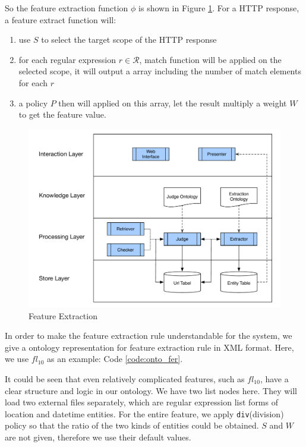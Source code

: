 So the feature extraction function $\phi$ is shown in Figure \ref{fig:feature_extraction}. For a HTTP response, a feature extract function will:
\begin{enumerate}
	\item use $S$ to select the target scope of the HTTP response
	\item for each regular expression $r \in \mathcal{R} $, match function will be applied on the selected scope, it will output a array including the number of match elements for each $r$
	\item a policy $P$ then will applied on this array, let the result multiply a weight $W$ to get the feature value.
\end{enumerate} 

\begin{figure}[htb]
	\centering
	\includegraphics[page=8,width=\textwidth]{images/diagrams.pdf}
	\caption{Feature Extraction}\label{fig:feature_extraction}
\end{figure}

In order to make the feature extraction rule understandable for the system, we give a ontology representation for feature extraction rule in XML format. Here, we use $fl_{10}$ as an example: Code \ref{code:onto_fer}.
\vspace{1em}


It could be seen that even relatively complicated features, such as $fl_10$, have a clear structure and logic in our ontology. We have two list nodes here. They will load two external files separately, which are regular expression list forms of location and datetime entities. For the entire feature, we apply \texttt{div}(division) policy so that the ratio of the two kinds of entities could be obtained. $S$ and $W$ are not given, therefore we use their default values.

